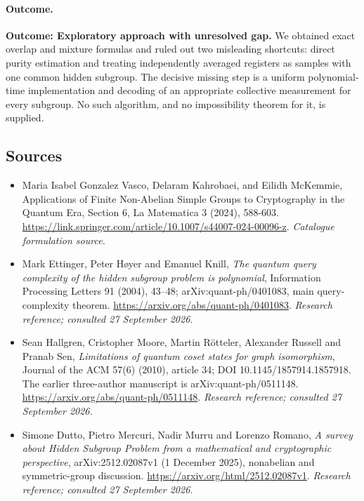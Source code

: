\documentclass[11pt,a4paper]{article}
\numberwithin{equation}{section}
\begin{document}
\paragraph{Outcome.}
\textbf{Outcome: Exploratory approach with unresolved gap.}
We obtained exact overlap and mixture formulas and ruled out two misleading shortcuts: direct purity estimation and treating independently averaged registers as samples with one common hidden subgroup. The decisive missing step is a uniform polynomial-time implementation and decoding of an appropriate collective measurement for every subgroup. No such algorithm, and no impossibility theorem for it, is supplied.

\subsection{Sources}
\begin{itemize}\raggedright
\item[\textnormal{[S1]}]\hypertarget{source:185:1}{} Maria Isabel Gonzalez Vasco, Delaram Kahrobaei, and Eilidh McKemmie, Applications of Finite Non-Abelian Simple Groups to Cryptography in the Quantum Era, Section 6, La Matematica 3 (2024), 588-603.
\url{https://link.springer.com/article/10.1007/s44007-024-00096-z}.
{\small\textit{Catalogue formulation source.}}
\item[\textnormal{[E1]}]\hypertarget{extra:185:1}{} Mark Ettinger, Peter H\o yer and Emanuel Knill, \emph{The quantum query complexity of the hidden subgroup problem is polynomial}, Information Processing Letters 91 (2004), 43--48; arXiv:quant-ph/0401083, main query-complexity theorem.
\url{https://arxiv.org/abs/quant-ph/0401083}.
{\small\textit{Research reference; consulted 27 September 2026.}}
\item[\textnormal{[E2]}]\hypertarget{extra:185:2}{} Sean Hallgren, Cristopher Moore, Martin R\"otteler, Alexander Russell and Pranab Sen, \emph{Limitations of quantum coset states for graph isomorphism}, Journal of the ACM 57(6) (2010), article 34; DOI 10.1145/1857914.1857918. The earlier three-author manuscript is arXiv:quant-ph/0511148.
\url{https://arxiv.org/abs/quant-ph/0511148}.
{\small\textit{Research reference; consulted 27 September 2026.}}
\item[\textnormal{[E3]}]\hypertarget{extra:185:3}{} Simone Dutto, Pietro Mercuri, Nadir Murru and Lorenzo Romano, \emph{A survey about Hidden Subgroup Problem from a mathematical and cryptographic perspective}, arXiv:2512.02087v1 (1 December 2025), nonabelian and symmetric-group discussion.
\url{https://arxiv.org/html/2512.02087v1}.
{\small\textit{Research reference; consulted 27 September 2026.}}
\end{itemize}
\end{document}
